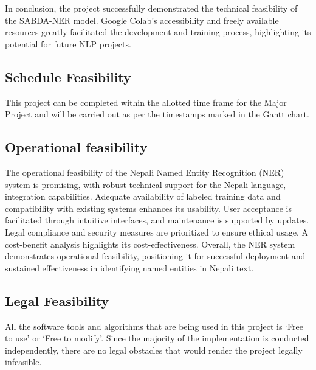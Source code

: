 In conclusion, the project successfully demonstrated the technical feasibility of the SABDA-NER model. Google Colab's accessibility and freely available resources greatly facilitated the development and training process, highlighting its potential for future NLP projects.

\subsection{Schedule Feasibility}
This project can be completed within the allotted time frame for the Major Project and 
will be carried out as per the timestamps marked in the Gantt chart.

\subsection{Operational feasibility}
The operational feasibility of the Nepali Named Entity Recognition (NER) system is promising, with robust technical support for the Nepali language, integration capabilities. Adequate availability of labeled training data and compatibility with existing systems enhances its usability. User acceptance is facilitated through intuitive interfaces, and maintenance is supported by updates. Legal compliance and security measures are prioritized to ensure ethical usage. A cost-benefit analysis highlights its cost-effectiveness. Overall, the NER system demonstrates operational feasibility, positioning it for successful deployment and sustained effectiveness in identifying named entities in Nepali text.

\subsection{Legal Feasibility}
All the software tools and algorithms that are being used in this project is ‘Free to use’ 
or ‘Free to modify’. Since the majority of the implementation is conducted 
independently, there are no legal obstacles that would render the project legally 
infeasible.